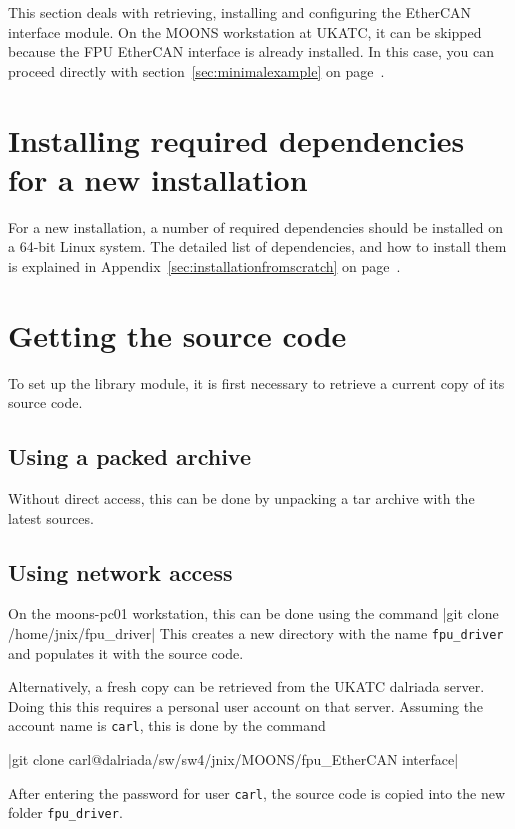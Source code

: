 \documentclass[fontsize=12,a4paper]{scrreprt}
\begin{document}
This section deals with retrieving, installing and configuring the
EtherCAN interface module. On the MOONS workstation at UKATC, it can
be skipped because the FPU EtherCAN interface is already installed.
In this case, you can proceed directly with
section~\ref{sec:minimalexample} on page~\pageref{sec:minimalexample}.

\section{Installing required dependencies for a new installation}
For a new installation, a number of required dependencies should be
installed on a 64-bit Linux system. The detailed list of dependencies,
and how to install them is explained in
Appendix~\ref{sec:installationfromscratch} on
page~\pageref{sec:installationfromscratch}.


\section{Getting the source code}

To set up the library module, it is first necessary to retrieve a
current copy of its source code.

\subsection{Using a packed archive}
Without direct access, this can be done by unpacking a tar archive
with the latest sources.


\subsection{Using network access}
On the moons-pc01 workstation, this can be done using the command
|git clone /home/jnix/fpu_driver| This creates a new
directory with the name \texttt{fpu\_driver} and populates it with the
source code.

Alternatively, a fresh copy can be retrieved from the UKATC dalriada
server. Doing this this requires a personal user account on that
server. Assuming the account name is \texttt{carl}, this is done by
the command

|git clone carl@dalriada/sw/sw4/jnix/MOONS/fpu_EtherCAN interface|

After entering the password for user \texttt{carl}, the
source code is copied into the new folder \texttt{fpu\_driver}.
\end{document}
